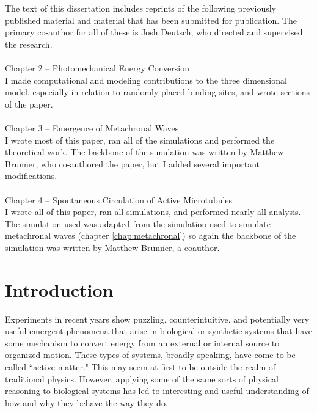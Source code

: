 \documentclass[11pt]{ucthesis}
\begin{document}
\begin{frontmatter}
\begin{acknowledgements}
The text of this dissertation includes
reprints of the following previously published material and material that has been submitted for publication. The primary co-author for all of these is Josh Deutsch, who directed and supervised the research.\\ \\
Chapter 2 -- Photomechanical Energy Conversion \cite{deutsch2015photomechanical}\\
I made computational and modeling contributions to the three dimensional model, especially in relation to randomly placed binding sites, and wrote sections of the paper.\\ \\
Chapter 3 -- Emergence of Metachronal Waves \cite{martin2018emergence}\\
I wrote most of this paper, ran all of the simulations and performed the theoretical work. The backbone of the simulation was written by Matthew Brunner, who co-authored the paper, but I added several important modifications. \\ \\
Chapter 4 -- Spontaneous Circulation of Active Microtubules \cite{martin2018spontaneous}\\
I wrote all of this paper, ran all simulations, and performed nearly all analysis. The simulation used was adapted from the simulation used to simulate metachronal waves (chapter \ref{chap:metachronal}) so again the backbone of the simulation was written by Matthew Brunner, a coauthor.
\end{acknowledgements}

\end{frontmatter}

\chapter{Introduction}

Experiments in recent years show puzzling, counterintuitive, and potentially very useful emergent phenomena that arise in biological or synthetic systems that have some mechanism to convert energy from an external or internal source to organized motion. These types of systems, broadly speaking, have come to be called ``active matter." This may seem at first to be outside the realm of traditional physics. However, applying some of the same sorts of physical reasoning to biological systems has led to interesting and useful understanding of how and why they behave the way they do.
\end{document}
